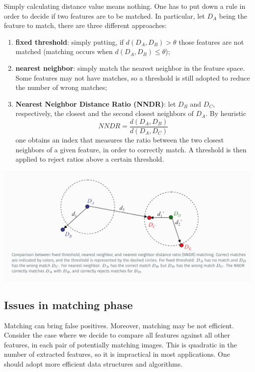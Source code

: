 \documentclass[10pt]{report}
\begin{document}
Simply calculating distance value means nothing. One has to put down a
rule in order to decide if two features are to be matched. In
particular, let \(D_A\) being the feature to match, there are three
different approaches:

\begin{enumerate}
\item \textbf{fixed threshold}: simply putting, if \(d(D_A, D_B) > \theta\) those
features are not matched (matching occurs when
\(d(D_A, D_B) \leq \theta\));
\item \textbf{nearest neighbor}: simply match the nearest neighbor in the feature
space. Some features may not have matches, so a threshold is still
adopted to reduce the number of wrong matches;
\item \textbf{Nearest Neighbor Distance Ratio (NNDR)}: let \(D_B\) and \(D_C\),
respectively, the closest and the second closest neighbors of \(D_A\).
By heuristic \[NNDR = \frac{d(D_A, D_B)}{d(D_A, D_C)}\] one obtains
an index that measures the ratio between the two closest neighbors of
a given feature, in order to correctly match. A threshold is then
applied to reject ratios above a certain threshold.
\end{enumerate}

\begin{center}
\includegraphics[width=.9\linewidth]{./pics/det/matching-strategies.jpg}
\end{center}

\subsection{Issues in matching phase}
\label{issues-in-matching-phase}
Matching can bring false positives. Moreover, matching may be not
efficient. Consider the case where we decide to compare all features
against all other features, in each pair of potentially matching images.
This is quadratic in the number of extracted features, so it is
impractical in most applications. One should adopt more efficient data
structures and algorithms.
\end{document}
